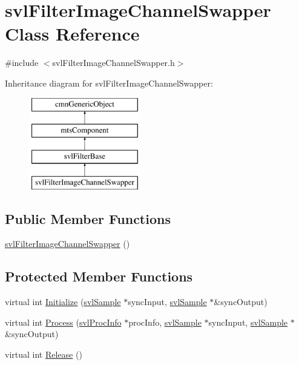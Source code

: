 \hypertarget{classsvl_filter_image_channel_swapper}{\section{svl\-Filter\-Image\-Channel\-Swapper Class Reference}
\label{classsvl_filter_image_channel_swapper}
}


{\ttfamily \#include $<$svl\-Filter\-Image\-Channel\-Swapper.\-h$>$}

Inheritance diagram for svl\-Filter\-Image\-Channel\-Swapper\-:\begin{figure}[H]
\begin{center}
\leavevmode
\includegraphics[height=4.000000cm]{d9/d87/classsvl_filter_image_channel_swapper}
\end{center}
\end{figure}
\subsection*{Public Member Functions}
\begin{DoxyCompactItemize}
\item 
\hyperlink{classsvl_filter_image_channel_swapper_a1e5aa79344f274867153fedc713dceda}{svl\-Filter\-Image\-Channel\-Swapper} ()
\end{DoxyCompactItemize}
\subsection*{Protected Member Functions}
\begin{DoxyCompactItemize}
\item 
virtual int \hyperlink{classsvl_filter_image_channel_swapper_ac9e9f46346a95a42b233a4df35d3d3b4}{Initialize} (\hyperlink{classsvl_sample}{svl\-Sample} $\ast$sync\-Input, \hyperlink{classsvl_sample}{svl\-Sample} $\ast$\&sync\-Output)
\item 
virtual int \hyperlink{classsvl_filter_image_channel_swapper_a2884044db183316e22e856c5d6f17ac9}{Process} (\hyperlink{structsvl_proc_info}{svl\-Proc\-Info} $\ast$proc\-Info, \hyperlink{classsvl_sample}{svl\-Sample} $\ast$sync\-Input, \hyperlink{classsvl_sample}{svl\-Sample} $\ast$\&sync\-Output)
\item 
virtual int \hyperlink{classsvl_filter_image_channel_swapper_a8d81a4bc8c8c0dd5ef8fa2fa8a213e9b}{Release} ()
\end{DoxyCompactItemize}

